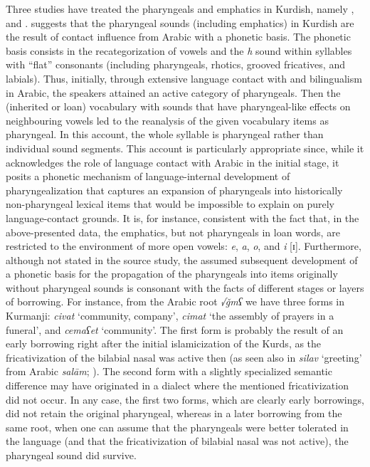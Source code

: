 \documentclass[output=paper]{langsci/langscibook}
\begin{document}
Three studies have treated the pharyngeals and emphatics in Kurdish, namely \citet{Kahn1976}, \citet{Anonbyforthcoming} and \citet{Barryforthcoming}. \citet{Barryforthcoming} suggests that the pharyngeal sounds (including emphatics) in Kurdish are the result of contact influence from Arabic with a phonetic basis. The phonetic basis consists in the recategorization of vowels and the \textit{h} sound within syllables with “flat” consonants (including pharyngeals, rhotics, grooved fricatives, and labials). Thus, initially, through extensive language contact with and bilingualism in Arabic, the speakers attained an active category of pharyngeals. Then the (inherited or loan) vocabulary with sounds that have pharyngeal-like effects on neighbouring vowels led to the reanalysis of the given vocabulary items as pharyngeal. In this account, the whole syllable is pharyngeal rather than individual sound segments. This account is particularly appropriate since, while it acknowledges the role of language contact with Arabic in the initial stage, it posits a phonetic mechanism of language-internal development of pharyngealization that captures an expansion of pharyngeals into historically non-pharyngeal lexical items that would be impossible to explain on purely language-contact grounds. It is, for instance, consistent with the fact that, in the above-presented data, the emphatics, but not pharyngeals in loan words, are restricted to the environment of more open vowels: \textit{e}, \textit{a}, \textit{o}, and \textit{i} [ɪ]. Furthermore, although not stated in the source study, the assumed subsequent development of a phonetic basis for the propagation of the pharyngeals into items originally without pharyngeal sounds is consonant with the facts of different stages or layers of borrowing. For instance, from the Arabic root \textit{√ǧmʕ} we have three forms in Kurmanji: \textit{civat} ‘community, company’, \textit{cimat} ‘the assembly of prayers in a funeral’, and \textit{cemaʕet} ‘community’. The first form is probably the result of an early borrowing right after the  initial islamicization of the Kurds, as the fricativization of the bilabial nasal was active then (as seen also in \textit{silav} ‘greeting’ from Arabic \textit{salām}; \citealt{Paul2008}). The second form with a slightly specialized semantic difference may have originated in a dialect where the mentioned fricativization did not occur. In any case, the first two forms, which are clearly early borrowings, did not retain the original pharyngeal, whereas in a later borrowing from the same root, when one can assume that the pharyngeals were better tolerated in the language (and that the fricativization of bilabial nasal was not active), the pharyngeal sound did survive.   
\end{document}

